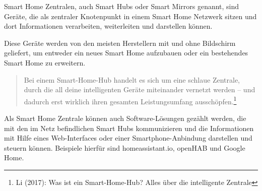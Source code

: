 \noindent Smart Home Zentralen, auch Smart Hubs oder Smart Mirrors genannt, sind Geräte, die als zentraler Knotenpunkt in einem Smart Home Netzwerk sitzen und dort Informationen verarbeiten, weiterleiten und darstellen können.\par
\noindent Diese Geräte werden von den meisten Herstellern mit und ohne Bildschirm geliefert, um entweder ein neues Smart Home aufzubauen oder ein bestehendes Smart Home zu erweitern. 
 	\begin{quote}
 		\color{quotetext}
 		Bei einem Smart-Home-Hub handelt es sich um eine schlaue Zentrale, durch die all deine intelligenten Geräte miteinander vernetzt werden – und dadurch erst wirklich ihren gesamten Leistungsumfang ausschöpfen.\footnote{Li (2017): Was ist ein Smart-Home-Hub? Alles über die intelligente Zentrale}
 	\end{quote}
\noindent Als Smart Home Zentrale können auch Software-Lösungen gezählt werden, die mit den im Netz befindlichen Smart Hubs kommunizieren und die Informationen mit Hilfe eines Web-Interfaces oder einer Smartphone-Anbindung darstellen und steuern können. 
Beispiele hierfür sind homeassistant.io, openHAB und Google Home.\par
